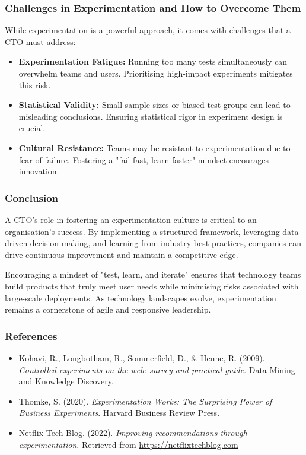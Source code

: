 \subsubsection{Challenges in Experimentation and How to Overcome Them}
While experimentation is a powerful approach, it comes with challenges that a CTO must address:

\begin{itemize}
    \item \textbf{Experimentation Fatigue:} Running too many tests simultaneously can overwhelm teams and users. Prioritising high-impact experiments mitigates this risk.
    \item \textbf{Statistical Validity:} Small sample sizes or biased test groups can lead to misleading conclusions. Ensuring statistical rigor in experiment design is crucial.
    \item \textbf{Cultural Resistance:} Teams may be resistant to experimentation due to fear of failure. Fostering a "fail fast, learn faster" mindset encourages innovation.
\end{itemize}

\subsubsection{Conclusion}
A CTO’s role in fostering an experimentation culture is critical to an organisation’s success. By implementing a structured framework, leveraging data-driven decision-making, and learning from industry best practices, companies can drive continuous improvement and maintain a competitive edge.

Encouraging a mindset of "test, learn, and iterate" ensures that technology teams build products that truly meet user needs while minimising risks associated with large-scale deployments. As technology landscapes evolve, experimentation remains a cornerstone of agile and responsive leadership.

\subsubsection{References}
\begin{itemize}
    \item Kohavi, R., Longbotham, R., Sommerfield, D., \& Henne, R. (2009). \textit{Controlled experiments on the web: survey and practical guide}. Data Mining and Knowledge Discovery.
    \item Thomke, S. (2020). \textit{Experimentation Works: The Surprising Power of Business Experiments}. Harvard Business Review Press.
    \item Netflix Tech Blog. (2022). \textit{Improving recommendations through experimentation}. Retrieved from \url{https://netflixtechblog.com}
\end{itemize}

